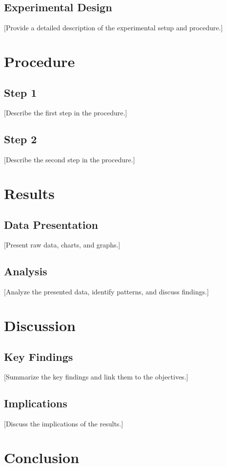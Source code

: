 \documentclass[journal]{IEEEtran}
\begin{document}
\subsection{Experimental Design}
[Provide a detailed description of the experimental setup and procedure.]

\section{Procedure}
\subsection{Step 1}
[Describe the first step in the procedure.]

\subsection{Step 2}
[Describe the second step in the procedure.]

\section{Results}
\subsection{Data Presentation}
[Present raw data, charts, and graphs.]

\subsection{Analysis}
[Analyze the presented data, identify patterns, and discuss findings.]

\section{Discussion}
\subsection{Key Findings}
[Summarize the key findings and link them to the objectives.]

\subsection{Implications}
[Discuss the implications of the results.]

\section{Conclusion}
\end{document}
